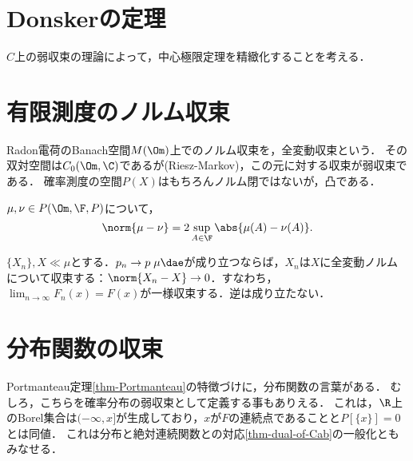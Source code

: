 \documentclass[uplatex,dvipdfmx]{jsreport}
\begin{document}
\section{Donskerの定理}

\begin{tcolorbox}[colframe=ForestGreen, colback=ForestGreen!10!white,breakable,colbacktitle=ForestGreen!40!white,coltitle=black,fonttitle=\bfseries\sffamily,
title=]
    $C$上の弱収束の理論によって，中心極限定理を精緻化することを考える．
\end{tcolorbox}

\section{有限測度のノルム収束}

\begin{tcolorbox}[colframe=ForestGreen, colback=ForestGreen!10!white,breakable,colbacktitle=ForestGreen!40!white,coltitle=black,fonttitle=\bfseries\sffamily,
    title=]
    Radon電荷のBanach空間$M(\Om)$上でのノルム収束を，全変動収束という．
    その双対空間は$C_0(\Om,\C)$であるが(Riesz-Markov)，この元に対する収束が弱収束である．
    確率測度の空間$P(X)$はもちろんノルム閉ではないが，凸である．
\end{tcolorbox}

\begin{lemma}[確率測度の全変動距離の特徴付け]
    $\mu,\nu\in P(\Om,\F,P)$について，
    \[\norm{\mu-\nu}=2\sup_{A\in\F}\abs{\mu(A)-\nu(A)}.\]
\end{lemma}

\begin{corollary}[Scheffe]
    $\{X_n\},X\ll\mu$とする．$p_n\to p\;\mu\dae$が成り立つならば，$X_n$は$X$に全変動ノルムについて収束する：$\norm{X_n-X}\to0$．すなわち，$\lim_{n\to\infty}F_n(x)=F(x)$が一様収束する．逆は成り立たない．
\end{corollary}

\section{分布関数の収束}

\begin{tcolorbox}[colframe=ForestGreen, colback=ForestGreen!10!white,breakable,colbacktitle=ForestGreen!40!white,coltitle=black,fonttitle=\bfseries\sffamily,
title=Euclid空間の確率測度の弱収束理論のもう一つの展開方法]
    Portmanteau定理\ref{thm-Portmanteau}の特徴づけに，分布関数の言葉がある．
    むしろ，こちらを確率分布の弱収束として定義する事もありえる．
    これは，$\R$上のBorel集合は$(-\infty,x]$が生成しており，$x$が$F$の連続点であることと$P[\{x\}]=0$とは同値．
    これは分布と絶対連続関数との対応\ref{thm-dual-of-Cab}の一般化ともみなせる．
\end{tcolorbox}
\end{document}
